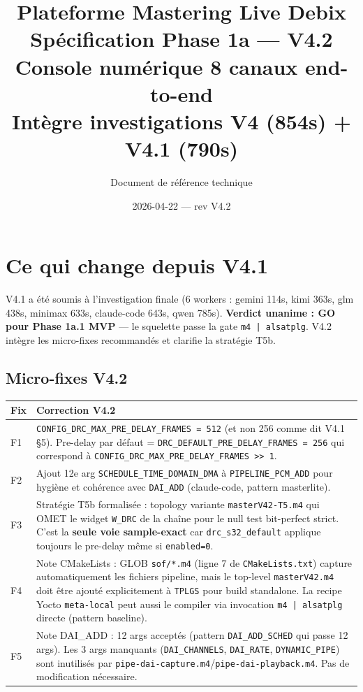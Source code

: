 \documentclass[11pt,a4paper]{article}
\title{\textbf{Plateforme Mastering Live Debix}\\[6pt]
  \Large Spécification Phase 1a --- \textbf{V4.2}\\[4pt]
  \large Console numérique 8 canaux end-to-end\\
  \normalsize Intègre investigations V4 (854s) + V4.1 (790s)}
\author{Document de référence technique}
\date{2026-04-22 --- rev V4.2}
\begin{document}
\maketitle
\tableofcontents
\clearpage

\section{Ce qui change depuis V4.1}

V4.1 a été soumis à l'investigation finale (6 workers : gemini 114s, kimi 363s, glm 438s, minimax 633s, claude-code 643s, qwen 785s). \textbf{Verdict unanime : GO pour Phase 1a.1 MVP} --- le squelette passe la gate \texttt{m4 | alsatplg}. V4.2 intègre les micro-fixes recommandés et clarifie la stratégie T5b.

\subsection{Micro-fixes V4.2}

\begin{center}
\begin{tabularx}{\textwidth}{lX}
\toprule
\textbf{Fix} & \textbf{Correction V4.2} \\
\midrule
F1 & \texttt{CONFIG\_DRC\_MAX\_PRE\_DELAY\_FRAMES = 512} (et non 256 comme dit V4.1 \S5). Pre-delay par défaut = \texttt{DRC\_DEFAULT\_PRE\_DELAY\_FRAMES = 256} qui correspond à \texttt{CONFIG\_DRC\_MAX\_PRE\_DELAY\_FRAMES >> 1}. \\
F2 & Ajout 12e arg \texttt{SCHEDULE\_TIME\_DOMAIN\_DMA} à \texttt{PIPELINE\_PCM\_ADD} pour hygiène et cohérence avec \texttt{DAI\_ADD} (claude-code, pattern masterlite). \\
F3 & Stratégie T5b formalisée : topology variante \texttt{masterV42-T5.m4} qui OMET le widget \texttt{W\_DRC} de la chaîne pour le null test bit-perfect strict. C'est la \textbf{seule voie sample-exact} car \texttt{drc\_s32\_default} applique toujours le pre-delay même si \texttt{enabled=0}. \\
F4 & Note CMakeLists : GLOB \texttt{sof/*.m4} (ligne 7 de \texttt{CMakeLists.txt}) capture automatiquement les fichiers pipeline, mais le top-level \texttt{masterV42.m4} doit être ajouté explicitement à \texttt{TPLGS} pour build standalone. La recipe Yocto \texttt{meta-local} peut aussi le compiler via invocation \texttt{m4 | alsatplg} directe (pattern baseline). \\
F5 & Note DAI\_ADD : 12 args acceptés (pattern \texttt{DAI\_ADD\_SCHED} qui passe 12 args). Les 3 args manquants (\texttt{DAI\_CHANNELS}, \texttt{DAI\_RATE}, \texttt{DYNAMIC\_PIPE}) sont inutilisés par \texttt{pipe-dai-capture.m4}/\texttt{pipe-dai-playback.m4}. Pas de modification nécessaire. \\
\bottomrule
\end{tabularx}
\end{center}
\end{document}
